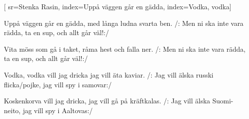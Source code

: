 [ 							
	sr={Stenka Rasin},					
	index={Uppå väggen går en gädda},
	index={Vodka, vodka}]		
	
\beginverse*						
Uppå väggen går en gädda, 
med långa ludna svarta ben.
/: Men ni ska inte vara rädda,
ta en sup, och allt går väl!:/
\endverse						

\beginverse				
Vita möss som gå i taket, 
råma hest och falla ner.
/: Men ni ska inte vara rädda,
ta en sup, och allt går väl!:/
\endverse
				
\beginverse				
Vodka, vodka vill jag dricka
jag vill äta kaviar.
/: Jag vill älska russki flicka/pojke, 
jag vill spy i samovar:/
\endverse	

\beginverse				
Koskenkorva vill jag dricka,
jag vill gå på kräftkalas.
/: Jag vill älska Suomi-neito, 
jag vill spy i Aaltovas:/
\endverse	
\endsong	
